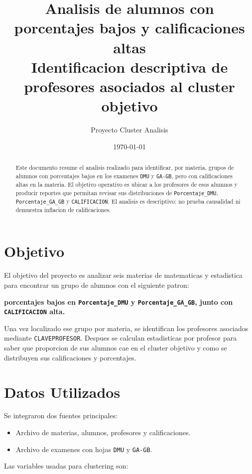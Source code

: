 \documentclass[11pt,letterpaper]{article}
\title{\textbf{Analisis de alumnos con porcentajes bajos y calificaciones altas}\\
\large Identificacion descriptiva de profesores asociados al cluster objetivo}
\author{Proyecto Cluster Analisis}
\date{\today}
\newcommand{\code}[1]{\texttt{#1}}
\begin{document}
\maketitle

\begin{abstract}
Este documento resume el analisis realizado para identificar, por materia, grupos de alumnos con porcentajes bajos en los examenes \code{DMU} y \code{GA-GB}, pero con calificaciones altas en la materia. El objetivo operativo es ubicar a los profesores de esos alumnos y producir reportes que permitan revisar sus distribuciones de \code{Porcentaje\_DMU}, \code{Porcentaje\_GA\_GB} y \code{CALIFICACION}. El analisis es descriptivo: no prueba causalidad ni demuestra inflacion de calificaciones.
\end{abstract}

\section{Objetivo}

El objetivo del proyecto es analizar seis materias de matematicas y estadistica para encontrar un grupo de alumnos con el siguiente patron:

\begin{center}
\textbf{porcentajes bajos en \code{Porcentaje\_DMU} y \code{Porcentaje\_GA\_GB}, junto con \code{CALIFICACION} alta.}
\end{center}

Una vez localizado ese grupo por materia, se identifican los profesores asociados mediante \code{CLAVEPROFESOR}. Despues se calculan estadisticas por profesor para saber que proporcion de sus alumnos cae en el cluster objetivo y como se distribuyen sus calificaciones y porcentajes.

\section{Datos Utilizados}

Se integraron dos fuentes principales:

\begin{itemize}
    \item Archivo de materias, alumnos, profesores y calificaciones.
    \item Archivo de examenes con hojas \code{DMU} y \code{GA-GB}.
\end{itemize}

Las variables usadas para clustering son:
\end{document}
